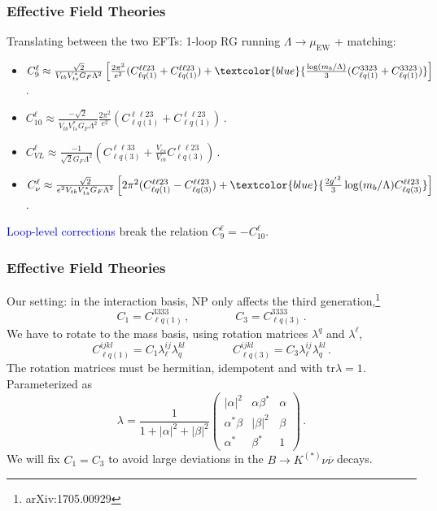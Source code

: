 \documentclass[mathserif, 10pt]{beamer}
\begin{document}
\begin{frame}
    \frametitle{Effective Field Theories}
    Translating between the two EFTs: 1-loop RG running $\Lambda \to \mu_\mathrm{EW}$ + matching:
    \begin{itemize}
        \item {\small $C_9^\ell \approx \frac{\sqrt{2}}{V_{tb}V_{ts}^* G_F \Lambda^2}\left[ \frac{2\pi^2}{e^2}(C_{\ell q(1)}^{\ell\ell23}+C_{\ell q(1)}^{\ell\ell23}) + \textcolor{blue}{\frac{\log(m_b/\Lambda)}{3}(C_{\ell q(1)}^{3323}+C_{\ell q(1)}^{3323})}\right]\, $.}
        \item {\small $C_{10}^\ell \approx \frac{-\sqrt{2}}{V_{tb}V_{ts}^* G_F \Lambda^2} \frac{2\pi^2}{e^2}(C_{\ell q(1)}^{\ell\ell23}+C_{\ell q(1)}^{\ell\ell23}) \, $.}
\item {\small $C_{VL}^\ell \approx \frac{-1}{\sqrt{2}G_F\Lambda^2}\left(C_{\ell q(3)}^{\ell\ell33}+ \frac{V_{cs}}{V_{cb}}C_{\ell q(3)}^{\ell\ell 23}\right)$\,.}
        \item {\small $C_\nu^\ell \approx \frac{\sqrt{2}}{e^2 V_{tb}V_{ts}^* G_F \Lambda^2}\left[2\pi^2(C_{\ell q(1)}^{\ell\ell 23}-C_{\ell q(3)}^{\ell\ell 23})+\textcolor{blue}{\frac{2{g'}^2}{3}\log(m_b/\Lambda)C_{\ell q(3)}^{\ell\ell 23}}\right]\,$.}
    \end{itemize}

\textcolor{blue}{Loop-level corrections} break the relation $C_9^\ell = -C_{10}^\ell$.

\end{frame}

\begin{frame}
    \frametitle{Effective Field Theories}

    Our setting: in the interaction basis, NP only affects the third generation,\footnote[1]{arXiv:1705.00929}
    $$C_1 = C_{\ell q(1)}^{3333}\,,\qquad\qquad C_3 = C_{\ell q(3)}^{3333}\,.$$
    We have to rotate to the mass basis, using rotation matrices $\lambda^q$ and $\lambda^\ell$,
    $$C_{\ell q(1)}^{ijkl} = C_1 \lambda_\ell^{ij}\lambda_q^{kl}\,\qquad\qquad C_{\ell q(3)}^{ijkl} = C_3 \lambda_\ell^{ij}\lambda_q^{kl}\,. $$
    The rotation matrices must be hermitian, idempotent and with $\mathrm{tr}\lambda =1$. Parameterized as
    $$ \lambda = \frac{1}{1+|\alpha|^2+|\beta|^2}\begin{pmatrix}
            |\alpha|^2 & \alpha \beta^* & \alpha \\ \alpha^* \beta & |\beta|^2 & \beta \\ \alpha^* & \beta^* & 1
        \end{pmatrix}\,. $$
    We will fix $C_1 = C_3$ to avoid large deviations in the $B\to K^{(*)}\nu\overline{\nu}$ decays.
\end{frame}
\end{document}
